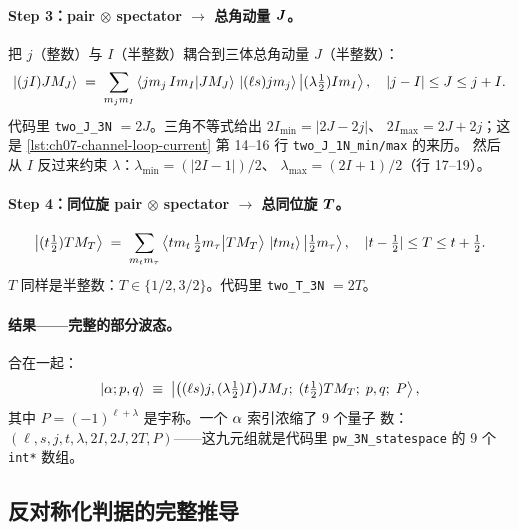\paragraph{Step 3：pair \(\otimes\) spectator \(\to\) 总角动量 \(\bm{J}\)。}
把 \(j\)（整数）与 \(I\)（半整数）耦合到三体总角动量 \(J\)（半整数）：
\begin{equation}
\label{eq:ch07-couple-J}
\ket{(jI)JM_J}
\;=\; \sum_{m_j m_I}
\braket{j m_j\, I m_I}{J M_J}\, \ket{(\ell s) j m_j}\ket{(\lambda \tfrac{1}{2}) I m_I},
\quad |j - I| \le J \le j + I.
\end{equation}
代码里 \verb|two_J_3N| \(= 2J\)。三角不等式给出 \(2I_{\min} = |2J - 2j|\)、
\(2I_{\max} = 2J + 2j\)；这是
\cref{lst:ch07-channel-loop-current} 第 14--16 行 \verb|two_J_1N_min/max| 的来历。
然后从 \(I\) 反过来约束 \(\lambda\)：\(\lambda_{\min} = (|2I - 1|)/2\)、
\(\lambda_{\max} = (2I+1)/2\)（行 17--19）。

\paragraph{Step 4：同位旋 pair \(\otimes\) spectator \(\to\) 总同位旋 \(\bm{T}\)。}
\begin{equation}
\label{eq:ch07-couple-T}
\ket{(t \tfrac{1}{2}) T M_T} \;=\; \sum_{m_t m_\tau}
\braket{t m_t\, \tfrac{1}{2} m_\tau}{T M_T}\,
\ket{t m_t}\ket{\tfrac{1}{2} m_\tau},
\quad |t - \tfrac{1}{2}| \le T \le t + \tfrac{1}{2}.
\end{equation}
\(T\) 同样是半整数：\(T \in \{1/2, 3/2\}\)。代码里
\verb|two_T_3N| \(= 2T\)。

\paragraph{结果——完整的部分波态。}
合在一起：
\begin{equation}
\label{eq:ch07-PW-state-full}
\ket{\alpha; p, q} \;\equiv\;
\ket{ \big( (\ell s) j, (\lambda \tfrac{1}{2}) I \big) J M_J;
       \;(t \tfrac{1}{2}) T M_T;\; p, q;\; P },
\end{equation}
其中 \(P = (-1)^{\ell + \lambda}\) 是宇称。一个 \(\alpha\) 索引浓缩了 9 个量子
数：\((\ell, s, j, t, \lambda, 2I, 2J, 2T, P)\)——这九元组就是代码里
\texttt{pw\_3N\_statespace} 的 9 个 \texttt{int*} 数组。

\subsection{反对称化判据的完整推导}
\label{subsec:ch07-pauli-derivation}

